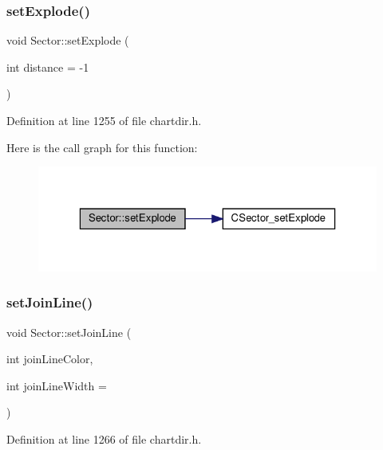 \subsubsection{\texorpdfstring{set\+Explode()}{setExplode()}}
{\footnotesize\ttfamily void Sector\+::set\+Explode (\begin{DoxyParamCaption}\item[{int}]{distance = {\ttfamily -\/1} }\end{DoxyParamCaption})\hspace{0.3cm}{\ttfamily [inline]}}



Definition at line 1255 of file chartdir.\+h.

Here is the call graph for this function\+:
\nopagebreak
\begin{figure}[H]
\begin{center}
\leavevmode
\includegraphics[width=323pt]{class_sector_ac3823667b60cbbb1ca4b632df50fc022_cgraph}
\end{center}
\end{figure}
\mbox{\label{class_sector_aec43c56a8b06d90ff6e0b8fa53b057dd}} 
\subsubsection{\texorpdfstring{set\+Join\+Line()}{setJoinLine()}}
{\footnotesize\ttfamily void Sector\+::set\+Join\+Line (\begin{DoxyParamCaption}\item[{int}]{join\+Line\+Color,  }\item[{int}]{join\+Line\+Width = {} }\end{DoxyParamCaption})\hspace{0.3cm}{\ttfamily [inline]}}



Definition at line 1266 of file chartdir.\+h.

